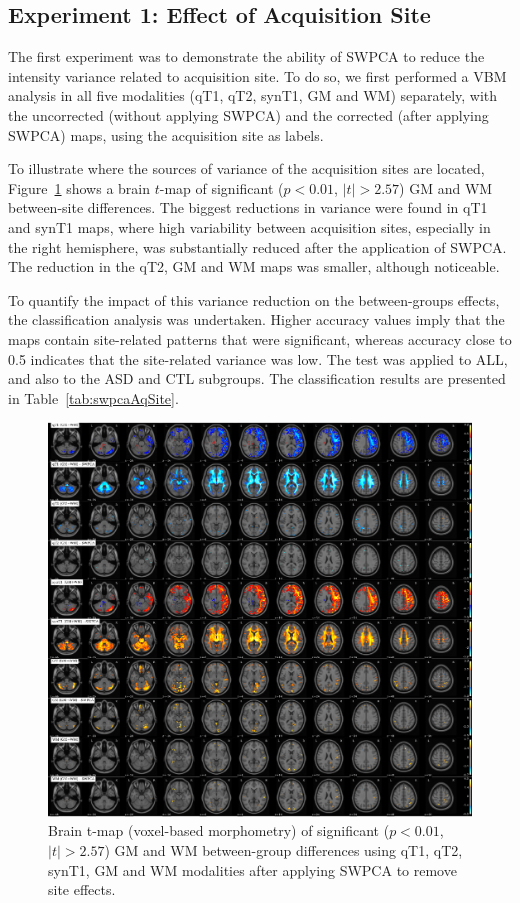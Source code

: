 \subsection{Experiment 1: Effect of Acquisition Site}\label{sec:swpcaE1}
The first experiment was to demonstrate the ability of SWPCA to reduce
the intensity variance related to acquisition site. To do so, we first
performed a \ac{VBM} analysis in all five modalities (\ac{qT1}, \ac{qT2}, \ac{synT1}, \ac{GM} and \ac{WM}) separately, with the uncorrected (without applying SWPCA) and
the corrected (after applying SWPCA) maps, using the acquisition site
as labels. 

To illustrate where the sources of variance of the acquisition sites are
located, Figure~\ref{fig:swpcaFIGURE03} shows a brain $t$-map of significant
($p<0.01$, $|t|>2.57$) \ac{GM} and \ac{WM}
between-site differences. The biggest reductions in variance were found
in \ac{qT1} and \ac{synT1} maps, where high variability between acquisition
sites, especially in the right hemisphere, was substantially reduced
after the application of SWPCA. The reduction in the \ac{qT2}, \ac{GM} and \ac{WM}
maps was smaller, although noticeable. 

To quantify the impact of this variance reduction on the between-groups
effects, the classification analysis was undertaken. Higher accuracy
values imply that the maps contain site-related patterns that were
significant, whereas accuracy close to 0.5 indicates that the
site-related variance was low. The test was applied to ALL, and also to
the ASD and CTL subgroups. The classification results are presented in
Table~\ref{tab:swpcaAqSite}. 
	
\begin{figure}
	\centering
	\includegraphics[width=\linewidth]{gfx/ch8/FIGURE03}
	\caption{Brain t-map (voxel-based morphometry) of significant ($p<0.01$, $|t|>2.57$) \ac{GM} and \ac{WM} between-group differences using \ac{qT1}, \ac{qT2}, \ac{synT1}, \ac{GM} and \ac{WM} modalities after applying \ac{SWPCA} to remove site effects.}
	\label{fig:swpcaFIGURE03}
\end{figure}

